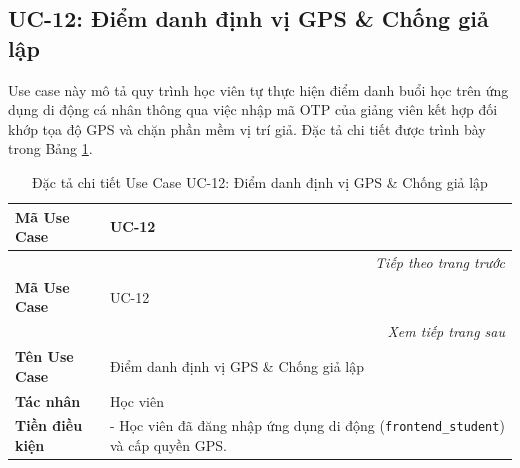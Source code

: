 \documentclass[../DoAn.tex]{subfiles}
\begin{document}
\subsection{UC-12: Điểm danh định vị GPS \& Chống giả lập}

\label{subsection:spec_uc_12}

Use case này mô tả quy trình học viên tự thực hiện điểm danh buổi học trên ứng dụng di động cá nhân thông qua việc nhập mã OTP của giảng viên kết hợp đối khớp tọa độ GPS và chặn phần mềm vị trí giả. Đặc tả chi tiết được trình bày trong Bảng \ref{table:spec_uc_12}.

\begin{longtable}{|p{2.8cm}|p{0.8cm}|p{2.2cm}|p{7.5cm}|}
    \caption{Đặc tả chi tiết Use Case UC-12: Điểm danh định vị GPS \& Chống giả lập}
    \label{table:spec_uc_12} \\
    \hline
    \textbf{Mã Use Case} & \multicolumn{3}{l|}{UC-12} \\ \hline
    \endfirsthead
    \multicolumn{4}{r}{\textit{Tiếp theo trang trước}} \\
    \hline
    \textbf{Mã Use Case} & \multicolumn{3}{l|}{UC-12} \\ \hline
    \endhead
    \hline
    \multicolumn{4}{r}{\textit{Xem tiếp trang sau}} \\
    \endfoot
    \hline
    \endlastfoot
    \textbf{Tên Use Case} & \multicolumn{3}{l|}{Điểm danh định vị GPS \& Chống giả lập} \\ \hline
    \textbf{Tác nhân} & \multicolumn{3}{l|}{Học viên} \\ \hline
    \textbf{Tiền điều kiện} & \multicolumn{3}{p{10.9cm}|}{- Học viên đã đăng nhập ứng dụng di động (\mbox{\texttt{frontend\_student}}) và cấp quyền GPS. 

}
\end{longtable}
\end{document}
